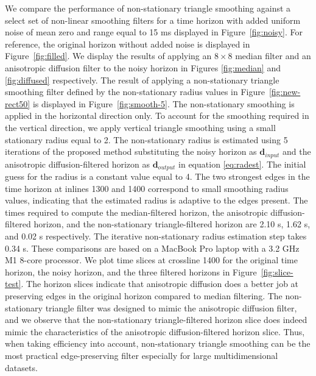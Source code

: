 We compare the performance of non-stationary triangle smoothing against a select set of non-linear smoothing filters for a time horizon with added uniform noise of mean zero and range equal to 15 ms displayed in Figure~\ref{fig:noisy}. For reference, the original horizon without added noise is displayed in Figure~\ref{fig:filled}. We display the results of applying an $8\times8$ median filter and an anisotropic diffusion filter to the noisy horizon in Figures \ref{fig:median} and \ref{fig:diffused} respectively. The result of applying a non-stationary triangle smoothing filter defined by the non-stationary radius values in Figure~\ref{fig:new-rect50} is displayed in Figure~\ref{fig:smooth-5}. 
The non-stationary smoothing is applied in the horizontal direction only. To account for the smoothing required in the vertical direction, we apply vertical triangle smoothing using a small stationary radius equal to 2. The non-stationary radius is estimated using 5 iterations of the proposed method substituting the noisy horizon as $\mathbf{d}_{input}$ and the anisotropic diffusion-filtered horizon as $\mathbf{d}_{output}$ in equation \ref{eq:radest}. The initial guess for the radius is a constant value equal to 4. The two strongest edges in the time horizon at inlines 1300 and 1400 correspond to small smoothing radius values, indicating that the estimated radius is adaptive to the edges present. The times required to compute the median-filtered horizon, the anisotropic diffusion-filtered horizon, and the non-stationary triangle-filtered horizon are 2.10 s, 1.62 s, and 0.02 s respectively. The iterative non-stationary radius estimation step takes 0.34 s. These comparisons are based on a MacBook Pro laptop with a 3.2 GHz M1 8-core processor. We plot time slices at crossline 1400 for the original time horizon, the noisy horizon, and the three filtered horizons in Figure~\ref{fig:slice-test}. The horizon slices indicate that anisotropic diffusion does a better job at preserving edges in the original horizon compared to median filtering. The non-stationary triangle filter was designed to mimic the anisotropic diffusion filter, and we observe that the non-stationary triangle-filtered horizon slice does indeed mimic the characteristics of the anisotropic diffusion-filtered horizon slice. Thus, when taking efficiency into account, non-stationary triangle smoothing can be the most practical edge-preserving filter especially for large multidimensional datasets. 


